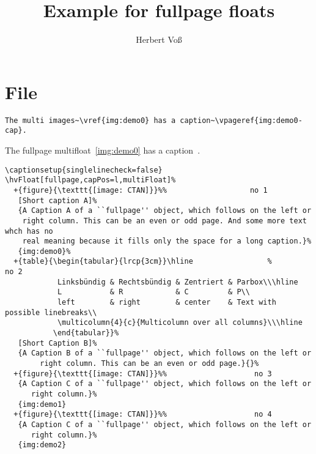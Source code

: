 \documentclass{scrartcl}
\begin{document}
\title{Example for fullpage floats}
\author{Herbert Voß}
\maketitle

\tableofcontents

\blinddocument

\section{File \texttt{\jobname}}

\begin{lstlisting}
The multi images~\vref{img:demo0} has a caption~\vpageref{img:demo0-cap}.
\end{lstlisting}

The fullpage multifloat~\vref{img:demo0} has a caption~.


\begin{lstlisting}
\captionsetup{singlelinecheck=false}
\hvFloat[fullpage,capPos=l,multiFloat]%
  +{figure}{\texttt{[image: CTAN]}}%%                   no 1
   [Short caption A]%
   {A Caption A of a ``fullpage'' object, which follows on the left or
    right column. This can be an even or odd page. And some more text whch has no
    real meaning because it fills only the space for a long caption.}%
   {img:demo0}%
  +{table}{\begin{tabular}{lrcp{3cm}}\hline                 %             no 2
            Linksbündig & Rechtsbündig & Zentriert & Parbox\\\hline
            L           & R            & C         & P\\
            left        & right        & center    & Text with possible linebreaks\\
            \multicolumn{4}{c}{Multicolumn over all columns}\\\hline
           \end{tabular}}%
   [Short Caption B]%
   {A Caption B of a ``fullpage'' object, which follows on the left or
        right column. This can be an even or odd page.}{}%
  +{figure}{\texttt{[image: CTAN]}}%%                    no 3
   {A Caption C of a ``fullpage'' object, which follows on the left or
      right column.}%
   {img:demo1}
  +{figure}{\texttt{[image: CTAN]}}%%                    no 4
   {A Caption C of a ``fullpage'' object, which follows on the left or
      right column.}%
   {img:demo2}
\end{lstlisting}
\end{document}
